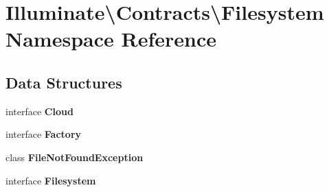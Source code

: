 \section{Illuminate\textbackslash{}Contracts\textbackslash{}Filesystem Namespace Reference}
\label{namespace_illuminate_1_1_contracts_1_1_filesystem}
\subsection*{Data Structures}
\begin{DoxyCompactItemize}
\item 
interface {\bf Cloud}
\item 
interface {\bf Factory}
\item 
class {\bf File\+Not\+Found\+Exception}
\item 
interface {\bf Filesystem}
\end{DoxyCompactItemize}
